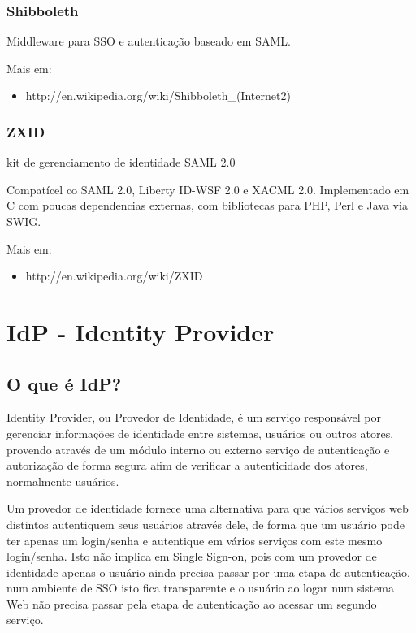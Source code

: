 \documentclass[11pt]{article}
\begin{document}
\subsubsection{Shibboleth}

Middleware para SSO e autenticação baseado em SAML.

Mais em:
\begin{itemize}
  \item{http://en.wikipedia.org/wiki/Shibboleth\_(Internet2)}
\end{itemize}

\subsubsection{ZXID}

kit de gerenciamento de identidade SAML 2.0

Compatícel co SAML 2.0, Liberty ID-WSF 2.0 e XACML 2.0. Implementado em C com
poucas dependencias externas, com bibliotecas para PHP, Perl e Java via SWIG.

Mais em:
\begin{itemize}
  \item{http://en.wikipedia.org/wiki/ZXID}
\end{itemize}

\section{IdP - Identity Provider}

\subsection{O que é IdP?}

Identity Provider, ou Provedor de Identidade, é um serviço responsável por
gerenciar informações de identidade entre sistemas, usuários ou outros atores,
provendo através de um módulo interno ou externo serviço de autenticação e
autorização de forma segura afim de verificar a autenticidade dos atores,
normalmente usuários.

Um provedor de identidade fornece uma alternativa para que vários serviços web
distintos autentiquem seus usuários através dele, de forma que um usuário pode
ter apenas um login/senha e autentique em vários serviços com este mesmo
login/senha. Isto não implica em Single Sign-on, pois com um provedor de
identidade apenas o usuário ainda precisa passar por uma etapa de
autenticação, num ambiente de SSO isto fica transparente e o usuário ao logar
num sistema Web não precisa passar pela etapa de autenticação ao acessar um
segundo serviço.
\end{document}
